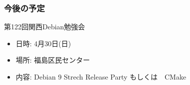 \documentclass[cjk,dvipdfmx,10pt,compress,%
hyperref={bookmarks=true,bookmarksnumbered=true,bookmarksopen=false,%
colorlinks=false,%
pdftitle={第 121 回 関西 Debian 勉強会},%
pdfauthor={倉敷・のがた・佐々木・かわだ},%
pdfsubject={資料},%
}]{beamer}
\begin{document}
\begin{frame}[fragile]
  \frametitle{今後の予定}
  \begin{block}{第122回関西Debian勉強会}
    \begin{itemize}
    \item 日時: 4月30日(日)
    \item 場所: 福島区民センター
    \item 内容: Debian 9 Strech Release Party もしくは　CMake
    \end{itemize}
  \end{block}

\end{frame}

\end{document}
